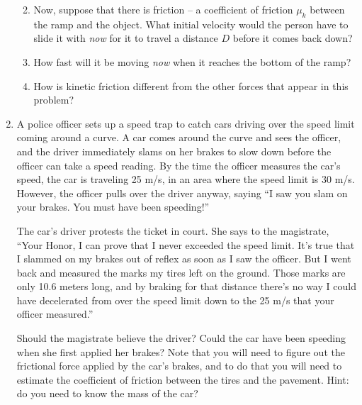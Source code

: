 \documentclass[12pt]{article}
\begin{document}
\begin{enumerate}
\begin{enumerate}
	\vspace{2in}
	
	\newpage
	
\item	Now, suppose that there is friction -- a coefficient of friction $\mu_k$ between the ramp and the object. 
What initial velocity would the person have to slide it with {\it now} for it to travel a distance $D$ before it comes back down?

\vspace{2in}


\item How fast will it be moving {\it now} when it reaches the bottom of the ramp? 

\vspace{2.7in}

\item How is kinetic friction different from the other forces that appear in this problem?


	
	

\end{enumerate}

\newpage



\item{A police officer sets up a speed trap to catch cars driving over the speed limit coming around a curve. A car comes around the curve and sees the officer, and the driver immediately slams on her brakes to slow down before the officer can take a speed reading. 
	By the time the officer measures the car's speed, the car is traveling 25 m/s, in an area where the speed limit is 30 m/s. However, the officer pulls over the driver anyway, saying ``I saw you slam on your brakes. You must have been speeding!''
	
	The car's driver protests the ticket in court. She says to the magistrate, ``Your Honor, I can prove that I never exceeded the speed limit. It's true that I slammed on my brakes out of reflex as soon as I saw the officer. But I went back and measured the marks
	my tires left on the ground. Those marks are only 10.6 meters long, and by braking for that distance there's no way I could have decelerated from over the speed limit down to the 25 m/s that your officer measured.''
	
	Should the magistrate believe the driver? Could the car have been speeding when she first applied her brakes? Note that you will need to figure out the frictional force applied by the car's brakes, and to do that you will need to estimate the coefficient of 
	friction between the tires and the pavement. Hint: do you need to know the mass of the car?}
\end{enumerate}
\end{document}
